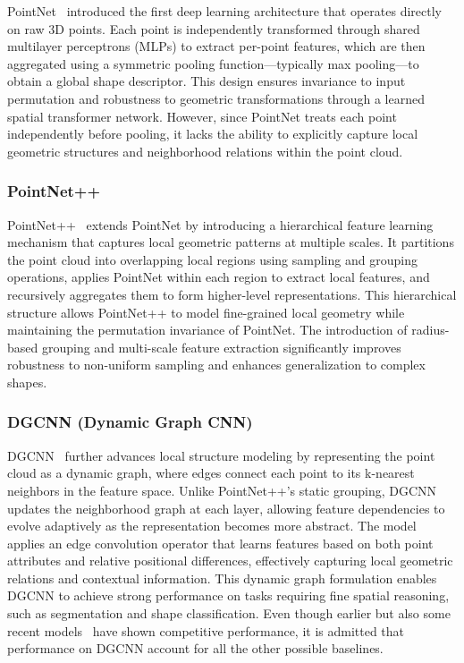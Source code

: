 PointNet~\cite{pointnet} introduced the first deep learning architecture that operates directly on raw 3D points. Each point is independently transformed through shared multilayer perceptrons (MLPs) to extract per-point features, which are then aggregated using a symmetric pooling function—typically max pooling—to obtain a global shape descriptor. This design ensures invariance to input permutation and robustness to geometric transformations through a learned spatial transformer network. However, since PointNet treats each point independently before pooling, it lacks the ability to explicitly capture local geometric structures and neighborhood relations within the point cloud.

\subsubsection{PointNet++}

PointNet++~\cite{pointnet++} extends PointNet by introducing a hierarchical feature learning mechanism that captures local geometric patterns at multiple scales. It partitions the point cloud into overlapping local regions using sampling and grouping operations, applies PointNet within each region to extract local features, and recursively aggregates them to form higher-level representations. This hierarchical structure allows PointNet++ to model fine-grained local geometry while maintaining the permutation invariance of PointNet. The introduction of radius-based grouping and multi-scale feature extraction significantly improves robustness to non-uniform sampling and enhances generalization to complex shapes.

\subsubsection{DGCNN (Dynamic Graph CNN)}

DGCNN~\cite{dgcnn} further advances local structure modeling by representing the point cloud as a dynamic graph, where edges connect each point to its k-nearest neighbors in the feature space. Unlike PointNet++’s static grouping, DGCNN updates the neighborhood graph at each layer, allowing feature dependencies to evolve adaptively as the representation becomes more abstract. The model applies an edge convolution operator that learns features based on both point attributes and relative positional differences, effectively capturing local geometric relations and contextual information. This dynamic graph formulation enables DGCNN to achieve strong performance on tasks requiring fine spatial reasoning, such as segmentation and shape classification. Even though earlier but also some recent models~\cite{pointcnn, pointconv, kpconv, pvcnn} have shown competitive performance, it is admitted that performance on DGCNN account for all the other possible baselines.

